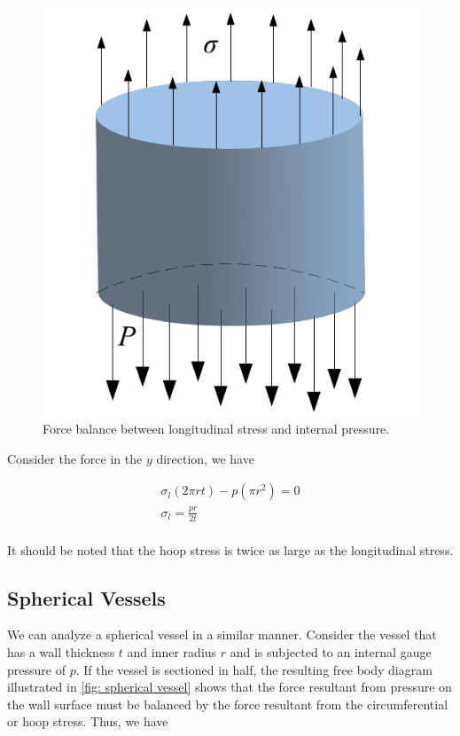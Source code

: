 \documentclass[
10pt,
a4paper,
openany,
svgnames,
]{book} %
\begin{document}
\begin{figure}[h]
  \centering
  \includegraphics[scale=0.7]{pictures/Combined-loadings/cylindrical-vessel-long}
  \caption{Force balance between longitudinal stress and internal pressure.}
  \label{fig: cylindrical vessel circumferential}
\end{figure}

Consider the force in the $y$ direction, we have

\begin{equation}
  \begin{gathered}
    {\sigma _l}(2\pi rt) - p(\pi {r^2}) = 0 \\ 
    {\sigma _l} = \frac{{pr}}{{2t}} \\ 
  \end{gathered}
\end{equation}

It should be noted that the hoop stress is twice as large as the longitudinal stress.

\subsection{Spherical Vessels}

We can analyze a spherical vessel in a similar manner. Consider the vessel that has a wall thickness $t$ and inner radius $r$ and is subjected to an internal gauge pressure of $p$. If the vessel is sectioned in half, the resulting free body diagram illustrated in \cref{fig: spherical vessel} shows that the force resultant from pressure on the wall surface must be balanced by the force resultant from the circumferential or hoop stress. Thus, we have
\end{document}
